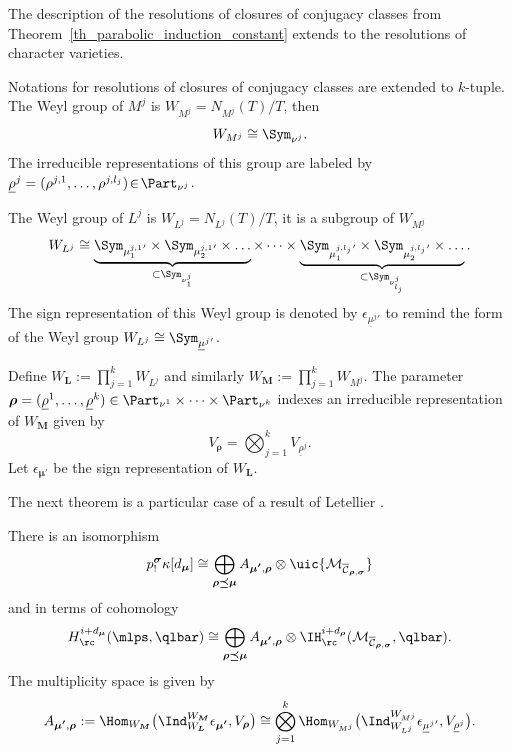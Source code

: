 The description of the resolutions of closures of conjugacy classes from Theorem~\ref{th_parabolic_induction_constant} extends to the resolutions of character varieties.
\begin{notations}
Notations for resolutions of closures of conjugacy classes are extended to $k$-tuple.
The Weyl group of $M^j$ is $W_{M^j}=N_{M^j}(T)/T$, then
\[
W_{M^j}\cong \Sym_{\nu^j}.
\]
The irreducible representations of this group are labeled by $\underline{\rho}^j=(\rho^{j,1},\dots,\rho^{j,l_j})\!\in\! \Part_{\nu^j}$.

The Weyl group of $L^j$ is $W_{L^j}=N_{L^j}(T)/T$, it is a subgroup of $W_{M^j}$
\[
W_{L^j} \cong \underbrace{\Sym_{{\mu^{j,1}_1}'}\times \Sym_{{\mu^{j,1}_2}'} \times \dots }_{\subset \Sym_{\nu^j_1}}\times \dots \times \underbrace{\Sym_{{\mu^{j,l_j}_1}'}\times \Sym_{{\mu^{j,l_j}_2}'} \times \dots}_{\subset \Sym_{\nu^j_{l_j}}}.
\]
The sign representation of this Weyl group is denoted by $\epsilon_{{\underline{\mu}^j}'}$ to remind the form of the Weyl group $W_{L^j}\cong \Sym_{{\underline{\mu}^j}'}$.

Define $W_{\boldsymbol{L}} := \prod_{j=1}^k W_{L^j} $ and similarly $W_{\boldsymbol{M}}:= \prod_{j=1}^k W_{M^j}$.
The parameter $\boldsymbol{\rho}=(\underline{\rho}^1,\dots,\underline{\rho}^k)\in \Part_{\nu^1}\times \dots \times \Part_{\nu^k}$ indexes an irreducible representation of $W_{\boldsymbol{M}}$ given by
\[
V_{\boldsymbol{\rho}}=\bigotimes_{j=1}^k V_{\underline{\rho}^j}.
\]
Let $\epsilon_{\boldsymbol{\mu'}}$ be the sign representation of $W_{\boldsymbol{L}}$.
\end{notations}

The next theorem is a particular case of a result of Letellier \cite[Th.\,5.4]{Letellier13}.
\begin{theorem}\label{th_coho_resol_char}
There is an isomorphism
\[
p^{\boldsymbol{\sigma}}_! \kappa [d_{\boldsymbol{\mu}}] \cong \bigoplus_{\boldsymbol{\rho\preceq \mu}} A_{\boldsymbol{\mu'},\boldsymbol{\rho}}\otimes \uic{\mathcal{M}_{\overline{\mathcal{C}}_{\boldsymbol{\rho},\boldsymbol{\sigma}}}}
\]
and in terms of cohomology
\begin{equation}\label{eq_cohomology_resol}
H^{i+d_{\boldsymbol{\mu}}}_\rc
(\mlps,\qlbar)
\cong
\bigoplus_{\boldsymbol{\rho\preceq \mu}}
A_{\boldsymbol{\mu'},\boldsymbol{\rho}}\otimes
\IH_{\rc}^{i+d_{\boldsymbol{\rho}}}(\mathcal{M}_{\overline{\mathcal{C}}_{\boldsymbol{\rho},\boldsymbol{\sigma}}},\qlbar).
\end{equation}
The multiplicity space is given by
\[
A_{\boldsymbol{\mu'},\boldsymbol{\rho}}:= \Hom_{W_{\boldsymbol{M}}}\bigl(\Ind_{W_{\boldsymbol{L}}}^{W_{\boldsymbol{M}}}\epsilon_{\boldsymbol{\mu'}}, V_{\boldsymbol{\rho}}\bigr) \cong \bigotimes_{j=1}^k \Hom_{W_{M^j}}\bigl(\Ind_{W_{L^j}}^{W_{M^j}} \epsilon_{{\underline{\mu}^j}'}, V_{\underline{\rho}^j}\bigr).
\]
\end{theorem}


